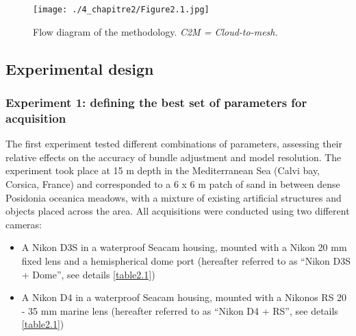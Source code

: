 \begin{figure}[htbp]
	\begin{center}
	\texttt{[image: ./4\_chapitre2/Figure2.1.jpg]}
		\caption[Flow diagram of the methodology.]{Flow diagram of the methodology. \textit{C2M = Cloud-to-mesh.}}
	\label{figure2.1}
	
\end{center}
\end{figure}

\subsection{Experimental design}\label{chapitre2_2.1}

\subsubsection{Experiment 1: defining the best set of parameters for acquisition}\label{chapitre2_2.1.1}

The first experiment tested different combinations of parameters, assessing their relative effects on the accuracy of bundle adjustment and model resolution. The experiment took place at 15 m depth in the Mediterranean Sea (Calvi bay, Corsica, France) and corresponded to a 6 x 6 m patch of sand in between dense Posidonia oceanica meadows, with a mixture of existing artificial structures and objects placed across the area. All acquisitions were conducted using two different cameras: 

\begin{itemize}[leftmargin=*]
    \item A Nikon D3S in a waterproof Seacam housing, mounted with a Nikon 20 mm fixed lens and a hemispherical dome port (hereafter referred to as “Nikon D3S + Dome”, see details \autoref{table2.1})
    \item A Nikon D4 in a waterproof Seacam housing, mounted with a Nikonos RS 20 - 35 mm marine lens (hereafter referred to as “Nikon D4 + RS”, see details \autoref{table2.1})
\end{itemize}

